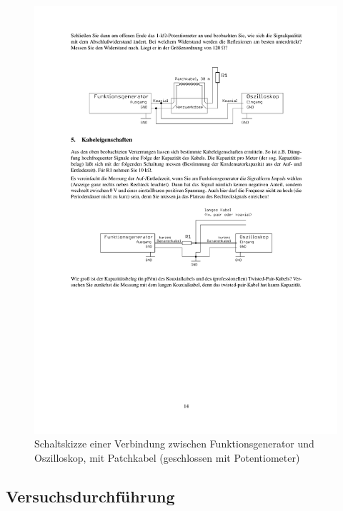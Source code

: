 \documentclass[12pt,a4paper]{article}
\begin{document}
\begin{figure}[H] 
  \centering
    \includegraphics[trim = 10mm 210mm 10mm 40mm, clip, scale = 1]{4-5.pdf}
  	\caption[Schaltskizze einer Verbindung zwischen Funktionsgenerator und Oszilloskop, mit Patchkabel (geschlossen mit Potentiometer)]{Schaltskizze einer Verbindung zwischen Funktionsgenerator und Oszilloskop, mit Patchkabel (geschlossen mit Potentiometer)\footnotemark}
  \label{fig:4.2}
\end{figure}

\subsection{Versuchsdurchführung}
\end{document}
